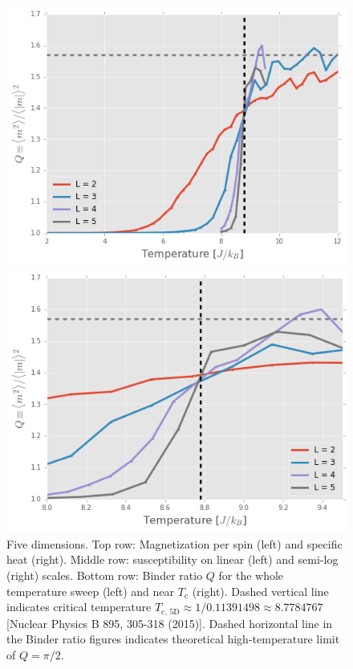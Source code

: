 \documentclass[11pt, oneside]{article}
\begin{document}
\begin{figure}[H]
    \begin{minipage}{0.47\textwidth}
    \includegraphics[width=\linewidth]{img/5D/binderQ}
    \end{minipage}
    \hspace{\fill} %
    \begin{minipage}{0.47\textwidth}
    \includegraphics[width=\linewidth]{img/5D/binderQ_close}
    \end{minipage}
\caption{Five dimensions. Top row: Magnetization per spin (left) and specific heat (right). Middle row: susceptibility on linear (left) and semi-log (right) scales. Bottom row: Binder ratio $Q$ for the whole temperature sweep (left) and near $T_\text{c}$ (right). Dashed vertical line indicates critical temperature $T_{\text{c, 5D}}\approx1/0.11391498\approx8.7784767$ [Nuclear Physics B 895, 305-318 (2015)]. Dashed horizontal line in the Binder ratio figures indicates theoretical high-temperature limit of $Q=\pi/2$.}
\label{fig:5D_all}
\end{figure}
\end{document}
